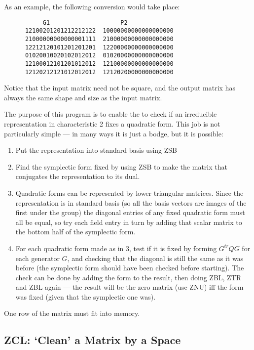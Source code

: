 As an example, the following conversion would take place:
\begin{center}
\begin{verbatim}
	       G1                    P2
      12100201201212212122  10000000000000000000
      21000000000000001111  21000000000000000000
      12212120101201201201  12200000000000000000
      01020010020102012012  01020000000000000000
      12100012101201012012  12100000000000000000
      12120212121012012012  12120200000000000000
\end{verbatim}
\end{center}

Notice that the input matrix need not be square, and the output
matrix has always the same shape and size as the input matrix.

The purpose of this program is to enable the {\MeatAxe} to check if an
irreducible representation in characteristic 2 fixes a quadratic form.
This job is not particularly simple --- in many ways it is just a
bodge, but it is possible:
\begin{enumerate}
\item	Put the representation into standard basis using ZSB
\item	Find the symplectic form fixed by using ZSB to make the
	matrix that conjugates the representation to its dual.
\item	Quadratic forms can be represented by lower triangular matrices.
	Since the representation is in standard basis (so all the basis
	vectors are images of the first under the group) the diagonal
	entries of any fixed quadratic form must all be equal, so try
	each field entry in turn by adding that scalar matrix to the
	bottom half of the symplectic form.
\item	For each quadratic form made as in 3, test if it is fixed by
	forming
	$G^{tr}QG$ for each generator $G$, and checking that the
	diagonal is still the same as it was before (the symplectic
	form should have been checked before starting). The check can
	be done by adding the form to the result, then doing ZBL,
	ZTR and ZBL again --- the result will be the zero matrix (use
	ZNU) iff the form was fixed (given that the symplectic one was).
\end{enumerate}

\Limits
One row of the matrix must fit into memory.



\subsection{ZCL: `Clean' a Matrix by a Space}
\Syntax
{}

